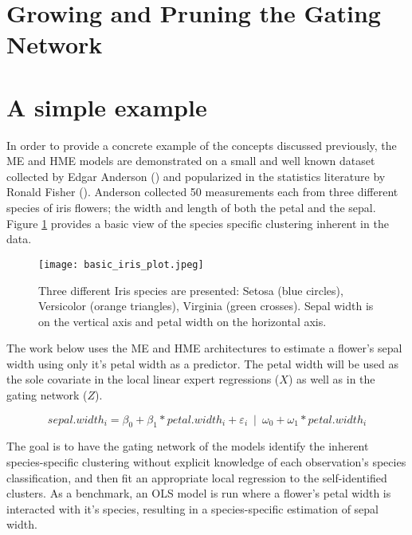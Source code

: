 \documentclass[12pt]{article}
\begin{document}
\section{Growing and Pruning the Gating Network} \label{sec:NetworkGrowth}


\section{A simple example} \label{sec:SimpleExample}

In order to provide a concrete example of the concepts discussed previously,
the ME and HME models are demonstrated on a small and well known dataset
collected by Edgar Anderson (\cite{Anderson1936}) and popularized in the
statistics literature by Ronald Fisher (\cite{Fisher1936}). Anderson collected
50 measurements each from three different species of iris flowers; the width and
length of both the petal and the sepal. Figure \ref{fig:Iris_dataset} provides a
basic view of the species specific clustering inherent in the data.

\begin{figure}[!ht]
  \texttt{[image: basic\_iris\_plot.jpeg]}
  \caption{Three different Iris species are presented: Setosa
  (blue circles), Versicolor (orange triangles), Virginia (green crosses).
  Sepal width is on the vertical axis and petal width on the horizontal
  axis.}
  \label{fig:Iris_dataset}
\end{figure}

The work below uses the ME and HME architectures to estimate a flower's sepal
width using only it's petal width as a predictor. The petal width will be used
as the sole covariate in the local linear expert regressions ($X$) as well as
in the gating network ($Z$). 

\begin{equation} \label{eq:HME_iris}
    sepal.width_{i} = \beta_{0} + \beta_{1} * petal.width_{i} + \varepsilon_{i} \enspace | \enspace \omega_{0} + \omega_{1} * petal.width_{i}
\end{equation}

The goal is to have the gating network of the 
models identify the inherent species-specific clustering without explicit
knowledge of each observation's species classification, and then fit an
appropriate local regression to the self-identified clusters. As a benchmark,
an OLS model is run where a flower's petal width is interacted with it's species,
resulting in a species-specific estimation of sepal width.
\end{document}
